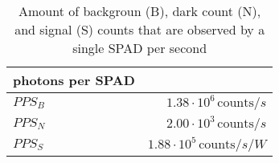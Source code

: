 \begin{table}[H]
\centering
\caption{Amount of backgroun (B), dark count (N), and signal (S) counts that are observed by a single SPAD per second}
\label{tab:photons_per_SPAD}
\begin{tabular}{|l|r|}\hline
    \textbf{photons per SPAD} & \\
    \hline 
    $PPS_B$ & $1.38\cdot10^{6}\, \text{counts}/s$ \\
    $PPS_N$ & $2.00\cdot10^{3}\, \text{counts}/s$ \\
    $PPS_S$ & $1.88\cdot10^{5}\, \text{counts}/s/W$ \\
    \hline 
\end{tabular}
\end{table}
